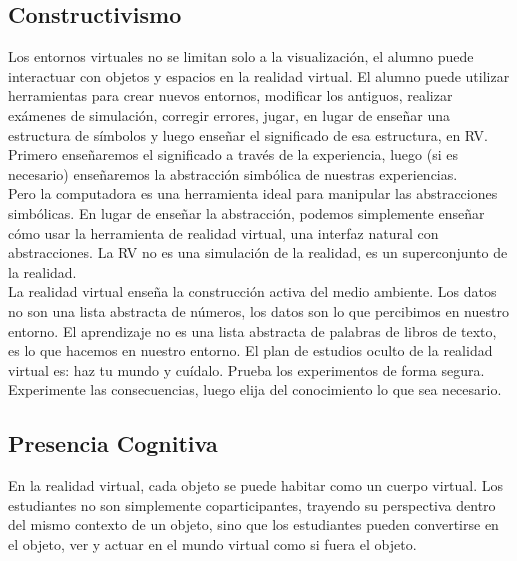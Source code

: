 \subsection{Constructivismo}
Los entornos virtuales no se limitan solo a la visualización, el alumno puede interactuar con objetos y espacios en la realidad virtual. El alumno puede utilizar herramientas para crear 
nuevos entornos, modificar los antiguos, realizar exámenes de simulación, corregir errores, jugar, en lugar de enseñar una estructura de símbolos y luego enseñar el significado de esa 
estructura, en RV. Primero enseñaremos el significado a través de la experiencia, luego (si es necesario) enseñaremos la abstracción simbólica de nuestras experiencias.\\
Pero la computadora es una herramienta ideal para manipular las abstracciones simbólicas. En lugar de enseñar la abstracción, podemos simplemente enseñar cómo usar la herramienta 
de realidad virtual, una interfaz natural con abstracciones. La RV no es una simulación de la realidad, es un superconjunto de la realidad.\\
La realidad virtual enseña la construcción activa del medio ambiente. Los datos no son una lista abstracta de números, los datos son lo que percibimos en nuestro entorno. 
El aprendizaje no es una lista abstracta de palabras de libros de texto, es lo que hacemos en nuestro entorno. El plan de estudios oculto de la realidad virtual es: haz tu mundo y 
cuídalo. Prueba los experimentos de forma segura. Experimente las consecuencias, luego elija del conocimiento lo que sea necesario.
\subsection{Presencia Cognitiva}
En la realidad virtual, cada objeto se puede habitar como un cuerpo virtual. Los estudiantes no son simplemente coparticipantes, trayendo su perspectiva dentro del mismo contexto de un objeto, 
sino que los estudiantes pueden convertirse en el objeto, ver y actuar en el mundo virtual como si fuera el objeto. \cite{bricken1990learning}

